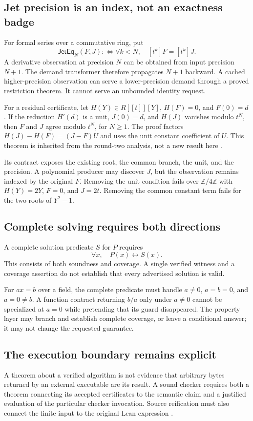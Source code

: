 \documentclass[11pt,a4paper]{article}
\newcommand{\Z}{\mathbb Z}
\newcommand{\Jet}{\mathsf{JetEq}}
\theoremstyle{definition}
\begin{document}
\subsection{Jet precision is an index, not an exactness badge}
For formal series over a commutative ring, put
\[
 \Jet_N(F,J):\Longleftrightarrow
       \forall k<N,\quad [t^k]F=[t^k]J.
\]
A derivative observation at precision $N$ can be obtained from input precision
$N+1$. The demand transformer therefore propagates $N+1$ backward. A cached
higher-precision observation can serve a lower-precision demand through a
proved restriction theorem. It cannot serve an unbounded identity request.

For a residual certificate, let $H(Y)\in R[[t]][Y]$, $H(F)=0$, and $F(0)=d$.
If the reduction $\overline H'(d)$ is a unit, $J(0)=d$, and $H(J)$ vanishes
modulo $t^N$, then $F$ and $J$ agree modulo $t^N$, for $N\ge1$. The proof factors
$H(J)-H(F)=(J-F)U$ and uses the unit constant coefficient of $U$. This theorem
is inherited from the round-two analysis, not a new result here
\cite{round2a,round2b}.

Its contract exposes the existing root, the common branch, the unit, and the
precision. A polynomial producer may discover $J$, but the observation remains
indexed by the original $F$. Removing the unit condition fails over $\Z/4\Z$
with $H(Y)=2Y$, $F=0$, and $J=2t$. Removing the common constant term fails for
the two roots of $Y^2-1$.

\subsection{Complete solving requires both directions}
A complete solution predicate $S$ for $P$ requires
\[
 \forall x,\quad P(x)\longleftrightarrow S(x).
\]
This consists of both soundness and coverage. A single verified witness and a
coverage assertion do not establish that every advertised solution is valid.

For $ax=b$ over a field, the complete predicate must handle $a\ne0$, $a=b=0$,
and $a=0\ne b$. A function contract returning $b/a$ only under $a\ne0$ cannot
be specialized at $a=0$ while pretending that its guard disappeared. The
property layer may branch and establish complete coverage, or leave a
conditional answer; it may not change the requested guarantee.

\subsection{The execution boundary remains explicit}
A theorem about a verified algorithm is not evidence that arbitrary bytes
returned by an external executable are its result. A sound checker requires
both a theorem connecting its accepted certificates to the semantic claim and
a justified evaluation of the particular checker invocation. Source reification
must also connect the finite input to the original Lean expression
\cite{round2a,leanvalidation}.
\end{document}
